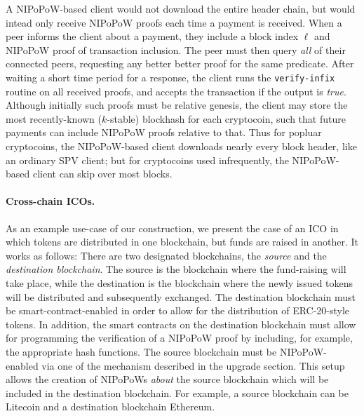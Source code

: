 A NIPoPoW-based client would not download the entire header chain, but would
intead only receive NIPoPoW proofs each time a payment is received. When a peer
informs the client about a payment, they include a block index $\ell$ and
NIPoPoW proof of transaction inclusion. The peer must then query \emph{all} of
their connected peers, requesting any better better proof for the same
predicate. After waiting a short time period for a response, the client runs the
\texttt{verify-infix} routine on all received proofs, and accepts the
transaction if the output is \emph{true}. Although initially such proofs must be
relative genesis, the client may store the most recently-known ($k$-stable)
blockhash for each cryptocoin, such that future payments can include NIPoPoW
proofs relative to that. Thus for popluar cryptocoins, the NIPoPoW-based client
downloads nearly every block header, like an ordinary SPV client; but for
cryptocoins used infrequently, the NIPoPoW-based client can skip over most
blocks.

\paragraph{Cross-chain ICOs.}
As an example use-case of our construction, we present the case of an
ICO in which tokens are distributed in one blockchain,
but funds are raised in another. It works as follows:
There are two designated blockchains, the \textit{source} and
the \textit{destination blockchain}. The source is the blockchain
where the fund-raising will take place, while the destination is the
blockchain where the newly issued tokens will be distributed and subsequently
exchanged. The destination blockchain must be smart-contract-enabled in order to
allow for the distribution of ERC-20-style~\cite{erc20} tokens.
In addition, the smart contracts on the destination blockchain must allow for
programming the verification of a NIPoPoW proof by including, for example, the
appropriate hash functions. The source blockchain must be NIPoPoW-enabled via
one of the mechanism described in the upgrade section. This setup allows the
creation of NIPoPoWs \textit{about} the source blockchain which will be included
in the destination blockchain. For example, a source blockchain can be Litecoin
and a destination blockchain Ethereum.

